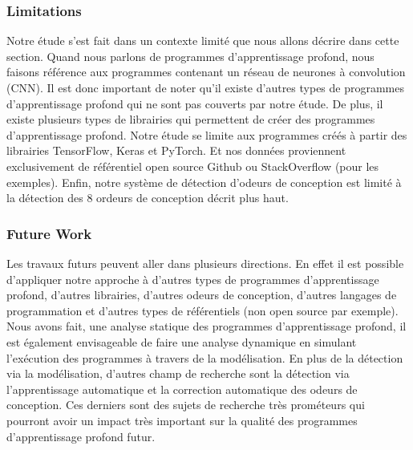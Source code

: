 \label{sec:limitationsFutureWork}

\subsubsection{Limitations}
\label{sec:limitations}
Notre étude s'est fait dans un contexte limité que nous allons décrire dans
cette section. Quand nous parlons de programmes d'apprentissage profond, nous faisons référence
aux programmes contenant un réseau de neurones à convolution (CNN). Il est
donc important de noter qu'il existe d'autres types de programmes
d'apprentissage profond qui ne sont pas couverts par notre étude. De plus, il
existe plusieurs types de librairies qui permettent de créer des programmes
d'apprentissage profond. Notre étude se limite aux programmes créés à
partir des librairies TensorFlow, Keras et PyTorch. Et nos données proviennent
exclusivement de référentiel open source Github ou StackOverflow (pour les
exemples). Enfin, notre système de détection d'odeurs de conception est limité à
la détection des 8 ordeurs de conception décrit plus haut.\\

\subsubsection{Future Work}
\label{sec:futureWork}
Les travaux futurs peuvent aller dans plusieurs directions. En effet il est
possible d'appliquer notre approche à d'autres types de programmes
d'apprentissage profond, d'autres librairies, d'autres odeurs de conception,
d'autres langages de programmation et d'autres types de référentiels (non open
source par exemple).
Nous avons fait, une analyse statique des programmes d'apprentissage profond, il
est également envisageable de faire une analyse dynamique en simulant
l'exécution des programmes à travers de la modélisation. En plus de la
détection via la modélisation, d'autres champ de recherche sont la
détection via l'apprentissage automatique et la correction automatique des
odeurs de conception. Ces derniers sont des sujets de recherche très prométeurs
qui pourront avoir un impact très important sur la qualité des programmes
d'apprentissage profond futur.







